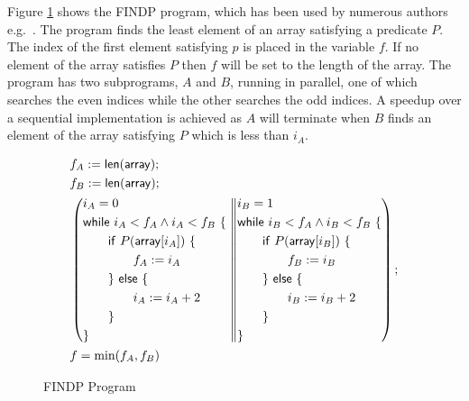 \documentclass{llncs}
\begin{document}
Figure \ref{fig:findp} shows the FINDP program, which has been
used by numerous authors
e.g.~\cite{owicki_axiomatic_1975,jones_development_1981,de_roever_concurrency_2001,hayes_refining_2013}. The
program finds the least element of an array satisfying a predicate
$P$. The index of the first element satisfying $p$ is placed in the
variable $f$. If no element of the array satisfies $P$
then $f$ will be set to the length of the array. The program has two
subprograms, $A$ and $B$, running in parallel, one of which searches
the even indices while the other searches the odd indices. A speedup
over a sequential implementation is achieved as $A$ will terminate
when $B$ finds an element of the array satisfying $P$ which is less
than $i_A$.
\begin{figure}
\[
\begin{aligned}
&f_A := \mathsf{len}(\mathsf{array});\\
&f_B := \mathsf{len}(\mathsf{array});\\
&\left(
\begin{aligned}
&i_A = 0\\
&\text{\textsf{while} } i_A < f_A \land i_A < f_B \text{ \{ }\\
&\qquad\text{\textsf{if} } P(\mathsf{array}[i_A]) \text{ \{}\\
&\qquad\qquad f_A := i_A\\
&\qquad\text{\} \textsf{else} \{}\\
&\qquad\qquad i_A := i_A + 2\\
&\qquad\text{\}}\\
&\text{\}}
\end{aligned}
\middle\|
\begin{aligned}
&i_B = 1\\
&\text{\textsf{while} } i_B < f_A \land i_B < f_B \text{ \{}\\
&\qquad\text{\textsf{if} } P(\mathsf{array}[i_B]) \text{ \{}\\
&\qquad\qquad f_B := i_B\\
&\qquad\text{\} \textsf{else} \{}\\
&\qquad\qquad i_B := i_B + 2\\
&\qquad\text{\}}\\
&\text{\}}
\end{aligned}
\right);\\
&f = \text{min}(f_A,f_B)
\end{aligned}
\]
\caption{FINDP Program}
\label{fig:findp}
\end{figure}
\end{document}
